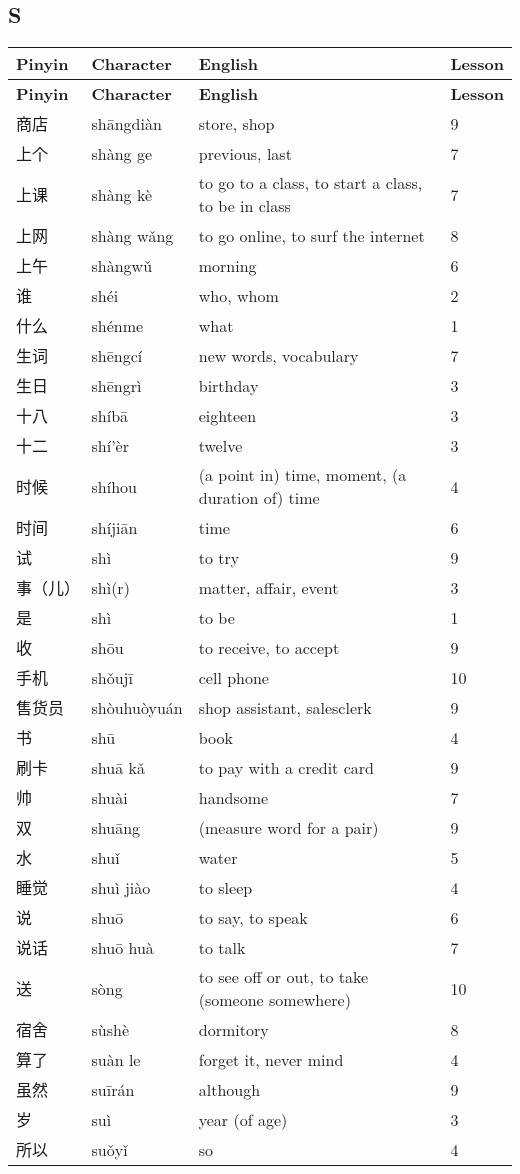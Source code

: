 \documentclass[12pt]{article}
\newcommand{\vocabitem}[4]{%
  #1 & #2 & #3 & #4 \\ \midrule
}
\begin{document}
\subsection*{S}
\begin{longtable}{P{\dimexpr\textwidth/4\relax}P{\dimexpr\textwidth/4\relax}P{\dimexpr\textwidth/4\relax}P{\dimexpr\textwidth/4\relax}}
\toprule
\textbf{Pinyin} & \textbf{Character} & \textbf{English} & \textbf{Lesson} \\
\midrule
\endfirsthead
\toprule
\textbf{Pinyin} & \textbf{Character} & \textbf{English} & \textbf{Lesson} \\
\midrule
\endhead
\vocabitem{商店}{shāngdiàn}{store, shop}{9}
\vocabitem{上个}{shàng ge}{previous, last}{7}
\vocabitem{上课}{shàng kè}{to go to a class, to start a class, to be in class}{7}
\vocabitem{上网}{shàng wǎng}{to go online, to surf the internet}{8}
\vocabitem{上午}{shàngwǔ}{morning}{6}
\vocabitem{谁}{shéi}{who, whom}{2}
\vocabitem{什么}{shénme}{what}{1}
\vocabitem{生词}{shēngcí}{new words, vocabulary}{7}
\vocabitem{生日}{shēngrì}{birthday}{3}
\vocabitem{十八}{shíbā}{eighteen}{3}
\vocabitem{十二}{shí'èr}{twelve}{3}
\vocabitem{时候}{shíhou}{(a point in) time, moment, (a duration of) time}{4}
\vocabitem{时间}{shíjiān}{time}{6}
\vocabitem{试}{shì}{to try}{9}
\vocabitem{事（儿）}{shì(r)}{matter, affair, event}{3}
\vocabitem{是}{shì}{to be}{1}
\vocabitem{收}{shōu}{to receive, to accept}{9}
\vocabitem{手机}{shǒujī}{cell phone}{10}
\vocabitem{售货员}{shòuhuòyuán}{shop assistant, salesclerk}{9}
\vocabitem{书}{shū}{book}{4}
\vocabitem{刷卡}{shuā kǎ}{to pay with a credit card}{9}
\vocabitem{帅}{shuài}{handsome}{7}
\vocabitem{双}{shuāng}{(measure word for a pair)}{9}
\vocabitem{水}{shuǐ}{water}{5}
\vocabitem{睡觉}{shuì jiào}{to sleep}{4}
\vocabitem{说}{shuō}{to say, to speak}{6}
\vocabitem{说话}{shuō huà}{to talk}{7}
\vocabitem{送}{sòng}{to see off or out, to take (someone somewhere)}{10}
\vocabitem{宿舍}{sùshè}{dormitory}{8}
\vocabitem{算了}{suàn le}{forget it, never mind}{4}
\vocabitem{虽然}{suīrán}{although}{9}
\vocabitem{岁}{suì}{year (of age)}{3}
\vocabitem{所以}{suǒyǐ}{so}{4}
\end{longtable}
\end{document}
